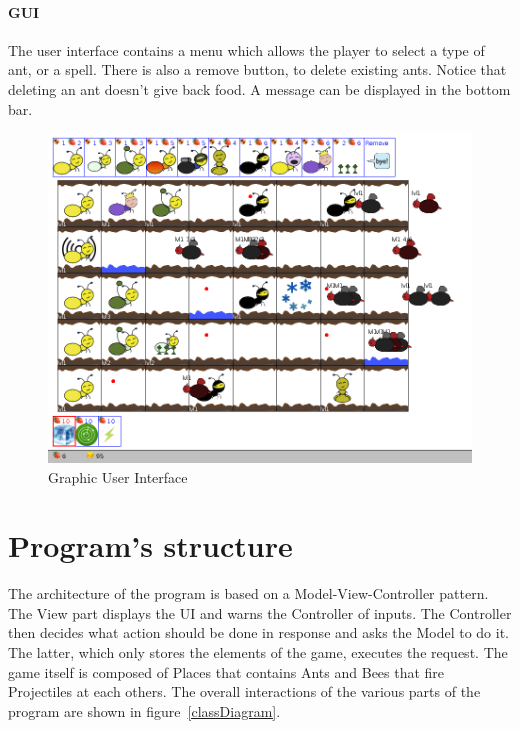 \documentclass[a4paper]{article}
\begin{document}
\paragraph{GUI} The user interface contains a menu which allows the player to select a type of ant, or a spell. There is also a remove button, to delete existing ants. Notice that deleting an ant doesn't give back food. A message can be displayed in the bottom bar.

\begin{figure}[H]
	\center
	\includegraphics[scale=0.3]{screen2.png}
	\caption{Graphic User Interface}
	\label{gui}
\end{figure}


\section{Program's structure} %

The architecture of the program is based on a Model-View-Controller pattern. The View part displays the UI and warns the Controller of inputs. The Controller then decides what action should be done in response and asks the Model to do it. The latter, which only stores the elements of the game, executes the request.
The game itself is composed of Places that contains Ants and Bees that fire Projectiles at each others.
The overall interactions of the various parts of the program are shown in figure~\ref{classDiagram}.
\end{document}
